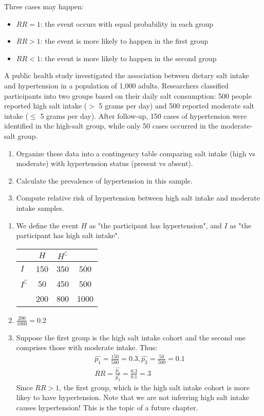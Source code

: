 Three cases may happen:
\begin{itemize}
	\item \( RR = 1 \): the event occurs with equal probability in each group
	\item \( RR > 1 \): the event is more likely to happen in the first group
	\item \( RR < 1 \): the event is more likely to happen in the second group
\end{itemize}

\begin{exmp}
	A public health study investigated the association between dietary salt intake and hypertension in a population of 1,000 adults.
	Researchers classified participants into two groups based on their daily salt consumption:
	500 people reported high salt intake (\(>\) 5 grams per day) and 500 reported moderate salt intake (\(\leq\) 5 grams per day).
	After follow-up, 150 cases of hypertension were identified in the high-salt group,
	while only 50 cases occurred in the moderate-salt group.
	\begin{enumerate}
		\item Organize these data into a contingency table comparing salt intake (high vs moderate) with hypertension status (present vs absent).
		\item Calculate the prevalence of hypertension in this sample.
		\item Compute relative risk of hypertension between high salt intake and moderate intake samples.
	\end{enumerate}
\end{exmp}
\begin{solution}
	\begin{enumerate}
        \item We define the event \( H \) as "the participant has hypertension", and \( I \) as "the participant has high salt intake".
		\begin{center}
		\begin{tabular}{l|cc|c}
							& \( H \) & \( H^\complement \) &  \\ \hline
		\( I \)                & 150 & 350 & 500\\ 
		\( I^\complement \)    & 50 & 450 & 500 \\ \hline
							& 200 & 800 & 1000
		\end{tabular}
		\end{center}
		\item \( \frac{200}{1000} = 0.2 \)
		\item Suppose the first group is the high salt intake cohort and the second one comprises those with moderate intake. Thus:
		\begin{gather*}
			\hat{p_1} = \frac{150}{500} = 0.3, \hat{p_2} = \frac{50}{500} = 0.1\\
			RR = \frac{\hat{p_1}}{\hat{p_2}} = \frac{0.3}{0.1} = 3
		\end{gather*}
		Since \( RR > 1 \), the first group, which is the high salt intake cohort is more likey to have hypertension.
		Note that we are not inferring high salt intake causes hypertension!
		This is the topic of a future chapter.
	\end{enumerate}
\end{solution}